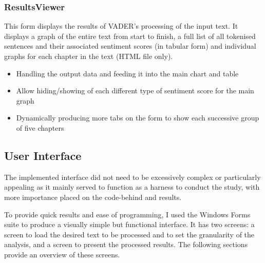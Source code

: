 \documentclass[a4paper]{article}
\begin{document}
        \subsubsection{ResultsViewer}
            This form displays the results of VADER's processing of the input text. It displays a graph of the entire text from start to finish, a full list of all tokenised sentences and their associated sentiment scores (in tabular form) and individual graphs for each chapter in the text (HTML file only).

            \begin{itemize}
                \item Handling the output data and feeding it into the main chart and table
                \item Allow hiding/showing of each different type of sentiment score for the main graph
                \item Dynamically producing more tabs on the form to show each successive group of five chapters
            \end{itemize}
    \subsection{User Interface}
        The implemented interface did not need to be excessively complex or particularly appealing as it mainly served to function as a harness to conduct the study, with more importance placed on the code-behind and results.

        To provide quick results and ease of programming, I used the Windows Forms suite to produce a visually simple but functional interface. It has two screens: a screen to load the desired text to be processed and to set the granularity of the analysis, and a screen to present the processed results. The following sections provide an overview of these screens.
\end{document}
